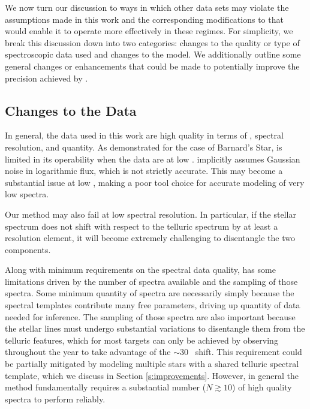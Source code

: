 \documentclass[modern]{aastex62}
\newcommand{\Mdwarf}{Barnard's Star\xspace} %
\begin{document}
{We now turn our discussion to ways in which other data sets may violate the assumptions made in this work and the corresponding modifications to \wobble that would enable it to operate more effectively in these regimes. 
For simplicity, we break this discussion down into two categories: changes to the quality or type of spectroscopic data used and changes to the model. 
We additionally outline some general changes or enhancements that could be made to potentially improve the \RV precision achieved by \wobble. 

\subsection{Changes to the Data}
\label{s:data-changes}

In general, the data used in this work are high quality in terms of \SNR, spectral resolution, and quantity. 
As demonstrated for the case of \Mdwarf, \wobble is limited in its operability when the data are at low \SNR. 
\wobble implicitly assumes Gaussian noise in logarithmic flux, which is not strictly accurate. 
This may become a substantial issue at low \SNR, making \wobble a poor tool choice for accurate modeling of very low \SNR spectra. 

Our method may also fail at low spectral resolution. 
In particular, if the stellar spectrum does not shift with respect to the telluric spectrum by at least a resolution element, it will become extremely challenging to disentangle the two components. 

Along with minimum requirements on the spectral data quality, \wobble has some limitations driven by the number of spectra available and the sampling of those spectra. 
Some minimum quantity of spectra are necessarily simply because the spectral templates contribute many free parameters, driving up quantity of data needed for inference. 
The sampling of those spectra are also important because the stellar lines must undergo substantial \RV variations to disentangle them from the telluric features, which for most targets can only be achieved by observing throughout the year to take advantage of the $\sim 30$ \kms~\BERV shift. 
This requirement could be partially mitigated by modeling multiple stars with a shared telluric spectral template, which we discuss in Section \ref{s:improvements}. 
However, in general the \wobble method fundamentally requires a substantial number ($N \gtrsim 10$) of high quality spectra to perform reliably.

}
\end{document}
